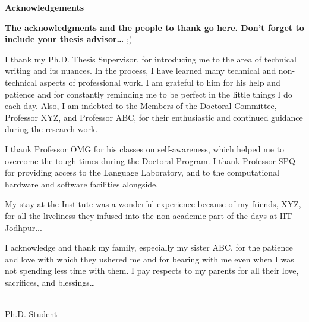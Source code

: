 \setmainfont[ Path = font/,
 BoldFont={CandaraBI}, 
 ItalicFont={booki},
 BoldItalicFont={bookbi}
 ]{bookr}

\begin{flushright}
\huge{\textbf{Acknowledgements}}
\end{flushright}


 \textbf{The acknowledgments and the people to thank go here. Don't forget to include your thesis advisor\ldots} ;)

 
 I thank my Ph.D. Thesis Supervisor, \textit{\supname} for introducing me to the area of technical writing and its nuances. In the process, I have learned many technical and non-technical aspects of professional work. I am grateful to him for his help and patience and for constantly reminding me to be perfect in the little things I do each day. Also, I am indebted to the Members of the Doctoral Committee, Professor XYZ, and Professor ABC, for their enthusiastic and continued guidance during the research work.

I thank Professor OMG for his classes on self-awareness, which helped me to overcome the tough times during the Doctoral Program. I thank Professor SPQ for providing access to the Language Laboratory, and to the computational hardware and software facilities alongside.

My stay at the Institute was a wonderful experience because of my friends, XYZ, for all the liveliness they infused into the non-academic part of the days at IIT Jodhpur... 

I acknowledge and thank my family, especially my sister ABC, for the patience and love with which they ushered me and for bearing with me even when I was not spending less time with them. I pay respects to my parents for all their love, sacrifices, and blessings… 

\begin{flushright}
\authorname  \\
Ph.D. Student \\
\deptname{} \\
\iitaiims{}
 
\end{flushright}



 
 
 



